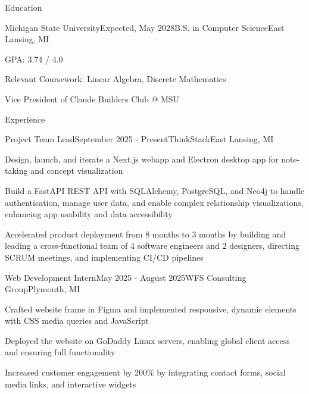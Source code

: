\documentclass[
	11pt
]{../resume}
\begin{document}
	\begin{rSection}{E}{ducation}
		\begin{rSectionEntry}{Michigan State University}{Expected, May 2028}{B.S. in Computer Science}{East Lansing, MI}
			\item GPA: 3.74 / 4.0
			\item Relevant Coursework: Linear Algebra, Discrete Mathematics
			\item Vice President of Claude Builders Club @ MSU
		\end{rSectionEntry}
	\end{rSection}

	\begin{rSection}{E}{xperience}
		\begin{rSectionEntry}{Project Team Lead}{September 2025 - Present}{ThinkStack}{East Lansing, MI}
			\item Design, launch, and iterate a Next.js webapp and Electron desktop app for note-taking and concept visualization
			\item Build a FastAPI REST API with SQLAlchemy, PostgreSQL, and Neo4j to handle authentication, manage user data, and enable complex relationship visualizations, enhancing app usability and data accessibility
			\item Accelerated product deployment from 8 months to 3 months by building and leading a cross-functional team of 4 software engineers and 2 designers, directing SCRUM meetings, and implementing CI/CD pipelines
		\end{rSectionEntry}

		\begin{rSectionEntry}{Web Development Intern}{May 2025 - August 2025}{WFS Consulting Group}{Plymouth, MI}
			\item Crafted website frame in Figma and implemented responsive, dynamic elements with CSS media queries and JavaScript
			\item Deployed the website on GoDaddy Linux servers, enabling global client access and ensuring full functionality
			\item Increased customer engagement by 200\% by integrating contact forms, social media links, and interactive widgets
		\end{rSectionEntry}
	\end{rSection}
\end{document}
